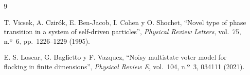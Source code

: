 \documentclass[11pt,a4paper]{article}
\begin{document}

\begin{thebibliography}{9}

T. Vicsek, A. Czirók, E. Ben-Jacob, I. Cohen y O. Shochet,
``Novel type of phase transition in a system of self-driven particles'',
\emph{Physical Review Letters}, vol.~75, n.º~6, pp.~1226--1229 (1995).

E. S. Loscar, G. Baglietto y F. Vazquez,
``Noisy multistate voter model for flocking in finite dimensions'',
\emph{Physical Review E}, vol.~104, n.º~3, 034111 (2021).

\end{thebibliography}
\end{document}
